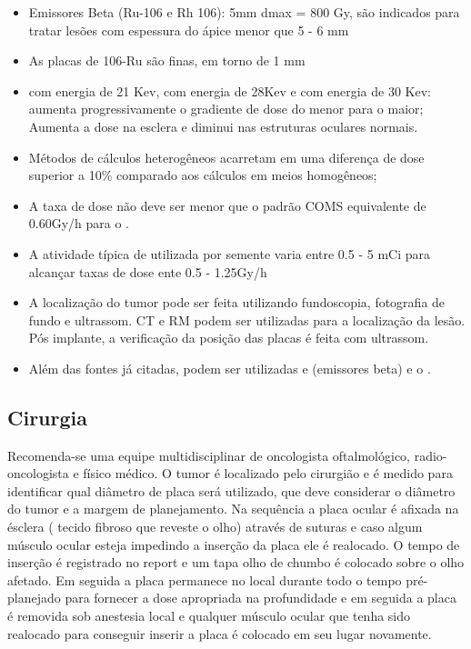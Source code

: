\documentclass[11pt,a4paper]{article}
\begin{document}
\begin{itemize}
        \item Emissores Beta (Ru-106 e Rh 106): 5mm dmax = 800 Gy, são indicados para tratar lesões com espessura do ápice menor que 5 - 6 mm
        \item As placas de 106-Ru são finas, em torno de 1 mm
        \item {} com energia de 21 Kev,  com energia de 28Kev e  com energia de 30 Kev: aumenta progressivamente o gradiente de dose do menor para o maior; Aumenta a dose na esclera e diminui nas estruturas oculares normais.
        \item Métodos de cálculos heterogêneos acarretam em uma diferença de dose superior a 10\% comparado aos cálculos em meios homogêneos;
        \item A taxa de dose não deve ser menor que o padrão COMS equivalente de 0.60Gy/h para o .
        \item A atividade típica de  utilizada por semente varia entre 0.5 - 5 mCi para alcançar taxas de dose ente 0.5 - 1.25Gy/h
        \item A localização do tumor pode ser feita utilizando fundoscopia, fotografia  de fundo e ultrassom. CT e RM podem ser utilizadas para a localização da lesão. Pós implante, a verificação da posição das placas é feita com ultrassom.
        \item Além das fontes já citadas, podem ser utilizadas  e  (emissores beta) e o .
    \end{itemize}


    \subsection{Cirurgia}

        Recomenda-se uma equipe multidisciplinar de oncologista oftalmológico, radio-oncologista e físico médico. O tumor é localizado pelo cirurgião e é medido para identificar qual diâmetro de placa será utilizado, que deve considerar o diâmetro do tumor e a margem de planejamento. Na sequência a placa ocular é afixada na ésclera ( tecido fibroso que reveste o olho) através de suturas e caso algum músculo ocular esteja impedindo a inserção da placa ele é realocado. O tempo de inserção é registrado no report e um tapa olho de chumbo é colocado sobre o olho afetado. Em seguida a placa permanece no local durante todo o tempo pré-planejado para fornecer a dose apropriada na profundidade e em seguida a placa é removida sob anestesia local e qualquer músculo ocular que tenha sido realocado para conseguir inserir a placa é colocado em seu lugar novamente.
\end{document}
